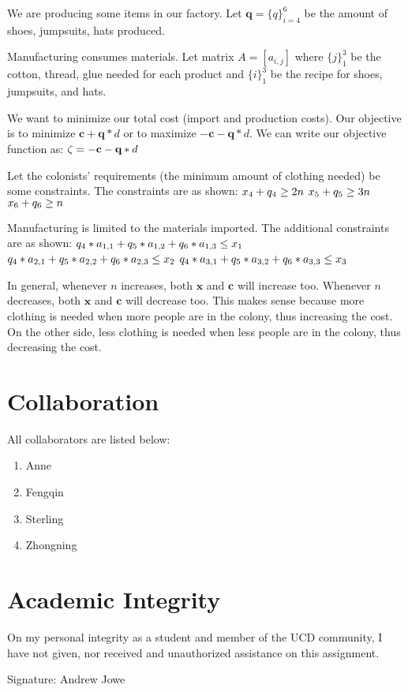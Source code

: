 \documentclass[17pt]{extarticle}
\begin{document}
\bigskip We are producing some items in our factory. Let $\textbf{q} = \{q\}_{i=4}^6$ be the amount of shoes, jumpsuits, hats produced.

\bigskip Manufacturing consumes materials. Let matrix $A = [a_{i,j}]$ where $\{j\}_1^3$ be the cotton, thread, glue needed for each product and $\{i\}_1^3$ be the recipe for shoes, jumpsuits, and hats.

\bigskip We want to minimize our total cost (import and production costs). Our objective is to minimize $\textbf{c}+\textbf{q}*d$ or to maximize $-\textbf{c}-\textbf{q}*d$. We can write our objective function as:
$\\\zeta = -\textbf{c}-\textbf{q}*d$

\bigskip Let the colonists' requirements (the minimum amount of clothing needed) be some constraints. The constraints are as shown:
$\\x_4 + q_4 \geq 2n$
$\\x_5 + q_5 \geq 3n$
$\\x_6 + q_6 \geq n$

\bigskip Manufacturing is limited to the materials imported. The additional constraints are as shown:
$\\q_4*a_{1,1} + q_5*a_{1,2} + q_6*a_{1,3} \leq x_1$
$\\q_4*a_{2,1} + q_5*a_{2,2} + q_6*a_{2,3} \leq x_2$
$\\q_4*a_{3,1} + q_5*a_{3,2} + q_6*a_{3,3} \leq x_3$

\bigskip In general, whenever $n$ increases, both $\textbf{x}$ and $\textbf{c}$ will increase too. Whenever $n$ decreases, both $\textbf{x}$ and $\textbf{c}$ will decrease too. This makes sense because more clothing is needed when more people are in the colony, thus increasing the cost. On the other side, less clothing is needed when less people are in the colony, thus decreasing the cost.

\newpage
\section*{Collaboration}
All collaborators are listed below:
\begin{enumerate}
    \item Anne
    \item Fengqin
    \item Sterling
    \item Zhongning
\end{enumerate}

\newpage
\section*{Academic Integrity}
On my personal integrity as a student and member of the UCD community, I have not given, nor received and unauthorized assistance on this assignment.

Signature: Andrew Jowe
\end{document}
